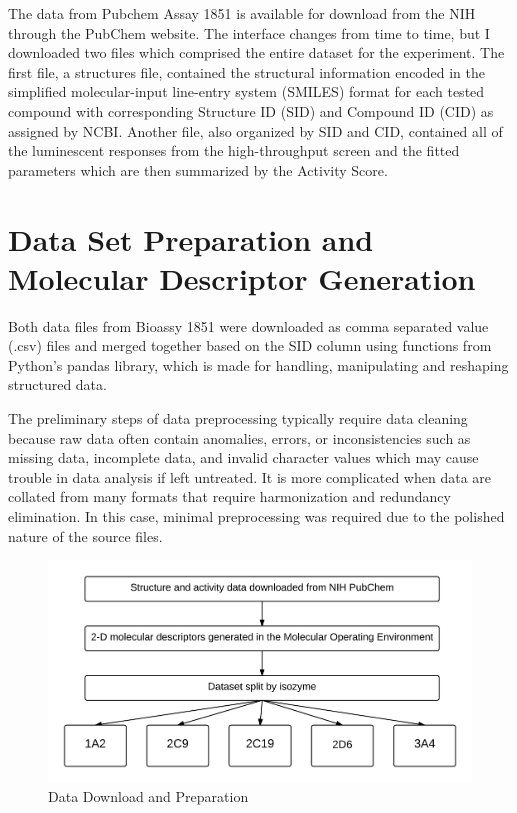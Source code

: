 The data from Pubchem Assay 1851 is available for download from the NIH through the PubChem website. The interface changes from time to time, but I downloaded two files which comprised the entire dataset for the experiment. The first file, a structures file, contained the structural information encoded in the simplified molecular-input line-entry system (SMILES) format for each tested compound with corresponding Structure ID (SID) and Compound ID (CID) as assigned by NCBI. Another file, also organized by SID and CID, contained all of the luminescent responses from the high-throughput screen and the fitted parameters which are then summarized by the Activity Score. 
 

\section{Data Set Preparation and Molecular Descriptor Generation }

Both data files from Bioassy 1851 were downloaded as comma separated value (.csv) files and merged together based on the SID column using functions from Python's pandas library, which is made for handling, manipulating and reshaping structured data.

The preliminary steps of data preprocessing typically require data cleaning because raw data often contain anomalies, errors, or inconsistencies such as missing data, incomplete data, and invalid character values which may cause trouble in data analysis if left untreated. It is more complicated when data are collated from many formats that require harmonization and redundancy elimination. \cite{Nantasenamat2009} In this case, minimal preprocessing was required due to the polished nature of the source files.


\begin{figure}[h,t]
  \centering
   \includegraphics[width=1\textwidth]{../img/Dataset_prep.png}
  \caption{Data Download and Preparation}
\end{figure}


